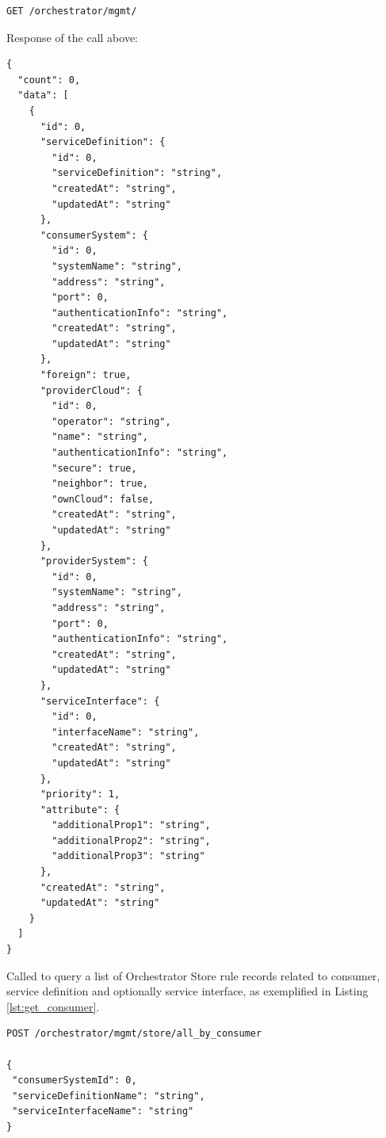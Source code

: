 \documentclass[a4paper]{arrowhead}
\newcommand{\fref}[1]{{\textcolor{ArrowheadBlue}{\hyperref[sec:functions:#1]{#1}}}}
\begin{document}
\begin{lstlisting}[language=http,label={lst:get_store_rules},caption={A \fref{Get all Store Entries} invocation.}]
GET /orchestrator/mgmt/
\end{lstlisting}

Response of the call above:

\begin{lstlisting}[language=http,label={lst:get_store_rules_res},caption={A \fref{Get all Store Entries} response is an StoreEntryList}]
{
  "count": 0,
  "data": [
    {
      "id": 0,
      "serviceDefinition": {
        "id": 0,
        "serviceDefinition": "string",
        "createdAt": "string",
        "updatedAt": "string"
      },
      "consumerSystem": {
        "id": 0,
        "systemName": "string",
        "address": "string",
        "port": 0,
        "authenticationInfo": "string",
        "createdAt": "string",
        "updatedAt": "string"
      },
      "foreign": true,
      "providerCloud": {
        "id": 0,
        "operator": "string",
        "name": "string",
        "authenticationInfo": "string",
        "secure": true,
        "neighbor": true,
        "ownCloud": false,
        "createdAt": "string",
        "updatedAt": "string"
      },
      "providerSystem": {
        "id": 0,
        "systemName": "string",
        "address": "string",
        "port": 0,
        "authenticationInfo": "string",
        "createdAt": "string",
        "updatedAt": "string"
      },
      "serviceInterface": {
        "id": 0,
        "interfaceName": "string",
        "createdAt": "string",
        "updatedAt": "string"
      },
      "priority": 1,
      "attribute": {
        "additionalProp1": "string",
        "additionalProp2": "string",
        "additionalProp3": "string"
      },
      "createdAt": "string",
      "updatedAt": "string"
    }
  ]
}
\end{lstlisting}


Called to query a list of Orchestrator Store rule records related to consumer, service definition and optionally service interface, as exemplified in Listing \ref{lst:get_consumer}.

\begin{lstlisting}[language=http,label={lst:get_consumer},caption={A \fref{Get Entries by Consumer} invocation.}]
POST /orchestrator/mgmt/store/all_by_consumer

{
 "consumerSystemId": 0,
 "serviceDefinitionName": "string",
 "serviceInterfaceName": "string"
}

\end{lstlisting}
\end{document}
